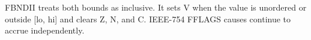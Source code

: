 FBNDII treats both bounds as inclusive. It sets V when the value is unordered or outside [lo, hi] and clears Z, N, and C. IEEE-754 FFLAGS causes continue to accrue independently.
